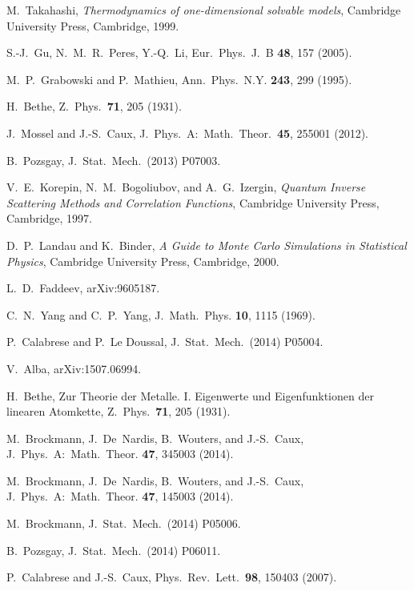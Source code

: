 \documentclass[11pt]{iopart}
\begin{document}
\begin{thebibliography}{99}
M.~Takahashi, {\it Thermodynamics of one-dimensional solvable models}, 
Cambridge University Press, Cambridge, 1999. 

S.-J.~Gu, N.~M.~R.~Peres, Y.-Q.~Li, Eur.\ Phys.\ J.\ B {\bf 48}, 157 (2005). 

M.~P.~Grabowski and P.~Mathieu, Ann.\ Phys.\ N.Y. {\bf 243}, 
299 (1995). 

H.~Bethe, Z.\ Phys.\ {\bf 71}, 205 (1931). 

J.~Mossel and J.-S.~Caux, J.\ Phys.\ A:\ Math.\ Theor.\ {\bf 45}, 
255001 (2012). 

B.~Pozsgay, J.\ Stat.\ Mech.\ (2013) P07003. 

V.~E.~Korepin, N.~M.~Bogoliubov, and A.~G.~Izergin, \emph{Quantum 
Inverse Scattering Methods and Correlation Functions}, Cambridge 
University Press, Cambridge, 1997. 

D.~P.~Landau and K.~Binder, \emph{A Guide to Monte Carlo Simulations in 
Statistical Physics}, Cambridge University Press, Cambridge, 2000.

L.~D.~Faddeev, arXiv:9605187.

C.~N.~Yang and C.~P.~Yang, J.\ Math.\ Phys. {\bf 10}, 1115 (1969).

P.~Calabrese and P.~Le Doussal, J.\ Stat.\ Mech.\ (2014) P05004. 

V.~Alba, arXiv:1507.06994.

H.~Bethe, Zur Theorie der Metalle. I. Eigenwerte und Eigenfunktionen 
der linearen Atomkette, Z.\ Phys.\ {\bf 71}, 205 (1931).

M.~Brockmann, J.~De~Nardis, B.~Wouters, and J.-S.~Caux, J.\ Phys.\ A:\ 
Math.\ Theor. {\bf 47}, 345003 (2014). 

M.~Brockmann, J.~De~Nardis, B.~Wouters, and J.-S.~Caux, J.\ Phys.\ A:\ 
Math.\ Theor. {\bf 47}, 145003 (2014). 

M.~Brockmann, J.\ Stat.\ Mech.\ (2014) P05006. 

B.~Pozsgay, J.\ Stat.\ Mech.\ (2014) P06011. 

P.~Calabrese and J.-S.~Caux, Phys.\ Rev.\ Lett.\ {\bf 98}, 150403 (2007).


\end{thebibliography}
\end{document}
